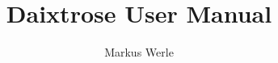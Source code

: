 \documentclass[11pt,twoside,a4paper]{article}
\begin{document}
\author{Markus Werle}
\title{Daixtrose User Manual}

\thispagestyle{empty}

\maketitle

\thispagestyle{empty}


\tableofcontents




\pagestyle{fancy}


%




%
\end{document}
